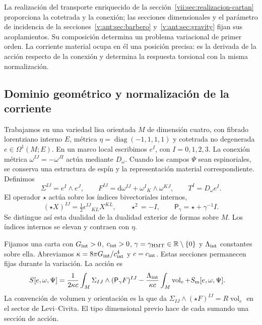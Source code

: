 La realización del transporte enriquecido de la
sección~\ref{vii:sec:realizacion-cartan} proporciona la cotetrada y la
conexión; las secciones dimensionales y el parámetro de incidencia de la
secciones~\ref{v:ant:sec:barbero} y~\ref{v:ant:sec:gravity} fijan sus acoplamientos. Su composición
determina un problema variacional de primer orden. La corriente material
ocupa en él una posición precisa: es la derivada de la acción respecto de
la conexión y determina la respuesta torsional con la misma normalización.

\subsection{Dominio geométrico y normalización de la corriente}
\label{vii:subsec:dominio-corriente-cartan}

Trabajamos en una variedad lisa orientada \(M\) de dimensión cuatro,
con fibrado lorentziano interno \(E\), métrica
\(\eta=\operatorname{diag}(-1,1,1,1)\) y cotetrada no degenerada
\(e\in\Omega^1(M;E)\). En un marco local escribimos
\(e^I\), con \(I=0,1,2,3\). La conexión métrica
\(\omega^{IJ}=-\omega^{JI}\) actúa mediante \(D_\omega\).
Cuando los campos \(\Psi\) sean espinoriales, se conserva una estructura
de espín y la representación material correspondiente. Definimos
\begin{equation}
 \Sigma^{IJ}=e^I\wedge e^J,\qquad
 F^{IJ}=\mathrm d\omega^{IJ}+\omega^I{}_{K}\wedge\omega^{KJ},
 \qquad T^I=D_\omega e^I.
 \label{vii:eq:campos-cartan}
\end{equation}
El operador \(\star\) actúa sobre los índices bivectoriales internos,
\begin{equation}
 (\star X)^{IJ}=\tfrac12\epsilon^{IJ}{}_{KL}X^{KL},
 \qquad \star^2=-I,\qquad
 \mathsf P_\gamma=\star+\gamma^{-1}I.
 \label{vii:eq:operador-holst}
\end{equation}
Se distingue así esta dualidad de la dualidad exterior de formas sobre
\(M\). Los índices internos se elevan y contraen con \(\eta\).

Fijamos una carta con \(G_{\rm int}>0\), \(c_{\rm int}>0\),
\(\gamma=\gamma_{\rm HMT}\in\mathbb R\setminus\{0\}\) y
\(\Lambda_{\rm int}\) constantes sobre ella. Abreviamos
\(\kappa=8\pi G_{\rm int}/c_{\rm int}^4\) y \(c=c_{\rm int}\).
Estas secciones permanecen fijas durante la variación. La acción es
\begin{equation}
 \begin{split}
 S[e,\omega,\Psi]={}&
 \frac1{2\kappa c}\int_M\Sigma_{IJ}\wedge
                         (\mathsf P_\gamma F)^{IJ}
 -\frac{\Lambda_{\rm int}}{\kappa c}
                         \int_M\operatorname{vol}_e
 +S_{\rm m}[e,\omega,\Psi].
 \end{split}
 \label{vii:eq:accion-cartan-holst}
\end{equation}
La convención de volumen y orientación es la que da
\(\Sigma_{IJ}\wedge(\star F)^{IJ}=R\operatorname{vol}_e\)
en el sector de Levi--Civita. El tipo dimensional previo hace de cada
sumando una sección de acción.


